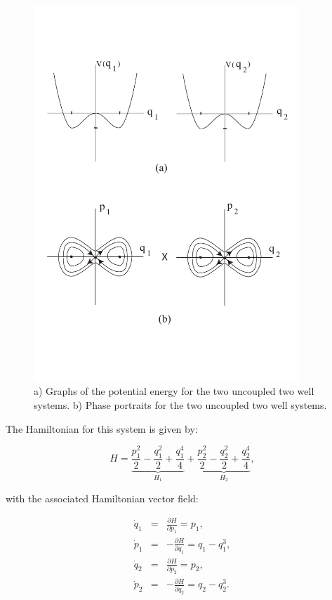 \documentclass{article}
\begin{document}
\begin{figure}[htb!]
\begin{center}
\includegraphics[width=10.0cm]{global_DS_1.pdf}
\end{center}
\caption{a) Graphs of the potential energy for the two uncoupled two well systems. b) Phase portraits for the two uncoupled two well systems.}
\label{fig:global DS 1}
\end{figure}

The Hamiltonian for this system is given by:

\begin{equation}
H =\underbrace{\frac{p_1^2}{2} - \frac{q_1^2}{2} + \frac{q_1^4}{4}}_{H_1} +
\underbrace{\frac{p_2^2}{2} - \frac{q_2^2}{2} + \frac{q_2^4}{4}}_{H_2},
\label{hamGDS}
\end{equation}


\noindent
with the associated Hamiltonian vector field:


\begin{eqnarray}
\dot{q}_1 & = & \frac{\partial H}{\partial p_1}=  p_1, \nonumber \\
\dot{p}_1 & = & -\frac{\partial H}{\partial q_1}= q_1 - q_1^3, \nonumber \\
\dot{q}_2 & = & \frac{\partial H}{\partial p_2}=  p_2, \nonumber \\
\dot{p}_2 & = & -\frac{\partial H}{\partial q_2}=  q_2- q_2^3. 
\label{hameqGDS}
\end{eqnarray}
\end{document}
